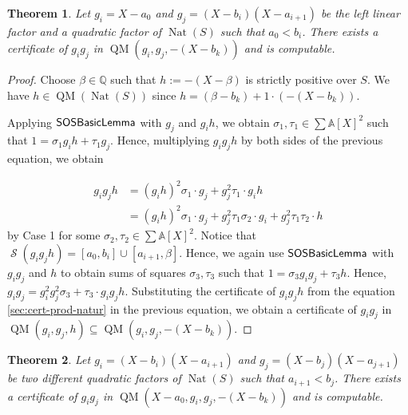 \documentclass[preprint,12pt,authoryear]{elsarticle}
\newtheorem{theorem}{Theorem}[section]
\newtheorem{proof}[theorem]{Proof}
\newcommand{\aX}{\mathbb{A}[X]}
\DeclareMathOperator{\quadmod}{QM}
\DeclareMathOperator{\semialgebraic}{\mathcal{S}}
\DeclareMathOperator{\algSOSBasicLemma}{\sf SOSBasicLemma}
\DeclareMathOperator{\Nat}{Nat}
\begin{document}
\begin{theorem}
  Let $g_i = X - a_0$ and $g_j = (X - b_i)(X - a_{i+1})$ be the left linear
  factor and a quadratic factor of $\Nat(S)$ such that $a_0 < b_i$. There exists
 a certificate of $g_i g_j$ in $\quadmod(g_i, g_j, -(X - b_k))$ and is
  computable.
\end{theorem}

\begin{proof}
  Choose $\beta \in \mathbb{Q}$ such that $h := -(X - \beta)$ is
  strictly positive over $S$. We have $h \in \quadmod(\Nat(S))$
 since $h = (\beta - b_k) + 1 \cdot (-(X - b_k))$.

  Applying $\algSOSBasicLemma$ with $g_j$ and $g_ih$, we obtain
  $\sigma_1, \tau_1 \in \sum{\aX}^2$ such that $1 = \sigma_1 g_ih + \tau_1
  g_j$. Hence, multiplying $g_ig_jh$ by both sides of the previous equation, we
 obtain

  \begin{equation} 
    \label{sec:cert-prod-natur}
    \begin{split}
      g_i g_j h &= (g_i h)^{2} \sigma_1 \cdot g_j
                  + g_j^{2} \tau_1 \cdot g_i h\\
                &= (g_i h)^{2}
                  \sigma_1 \cdot g_j
                  +g_j^{2} \tau_1 \sigma_2 \cdot g_i
                  + g_j^{2} \tau_1 \tau_2 \cdot h
    \end{split}
  \end{equation}
  by Case 1 for some $\sigma_2, \tau_2 \in \sum{\aX}^{2}$. Notice that
  $\semialgebraic(g_ig_jh) = [a_0, b_i] \cup [a_{i+1}, \beta]$. Hence, we again use
 $\algSOSBasicLemma$ with $g_ig_j$ and $h$ to obtain sums of squares
  $\sigma_3, \tau_3$ such that $1 = \sigma_3 g_ig_j + \tau_3 h$. Hence,
  $g_ig_j = g_i^{2}g_j^{2} \sigma_3 + \tau_3 \cdot g_i g_j h$. Substituting
 the certificate of $g_i g_j h$ from the equation
 \eqref{sec:cert-prod-natur} in the previous equation, we obtain a certificate of $g_ig_j$ in
  $\quadmod(g_i, g_j, h) \subseteq \quadmod(g_i, g_j, -(X - b_k))$.
\end{proof}

\begin{theorem} 
  \th\label{sec:cert-prod-natur-3}
  Let $g_i = (X - b_i)(X - a_{i+1})$ and $g_j = (X - b_j)(X - a_{j+1})$ be two
  different quadratic factors of $\Nat(S)$ such that $a_{i+1} < b_j$. There
 exists a certificate of $g_i g_j$ in $\quadmod(X - a_0, g_i, g_j, -(X - b_k))$
  and is computable.
\end{theorem}
\end{document}
